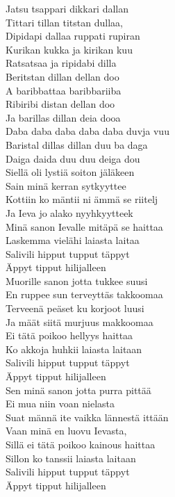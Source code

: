 Jatsu tsappari dikkari dallan\\
Tittari tillan titstan dullaa,\\
Dipidapi dallaa ruppati rupiran\\
Kurikan kukka ja kirikan kuu\\
\hop
Ratsatsaa ja ripidabi dilla\\
Beritstan dillan dellan doo\\
A baribbattaa baribbariiba\\
Ribiribi distan dellan doo\\
Ja barillas dillan deia dooa\\
Daba daba daba daba daba duvja vuu\\
Baristal dillas dillan duu ba daga\\
Daiga daida duu duu deiga dou\\
\hop
Siellä oli lystiä soiton jäläkeen\\
Sain minä kerran sytkyyttee\\
Kottiin ko mäntii ni ämmä se riitelj\\
Ja Ieva jo alako nyyhkyytteek\\
Minä sanon Ievalle mitäpä se haittaa\\
Laskemma vielähi laiasta laitaa\\
Salivili hipput tupput täppyt\\
Äppyt tipput hilijalleen\\
\hop
Muorille sanon jotta tukkee suusi\\
En ruppee sun terveyttäs takkoomaa\\
Terveenä peäset ku korjoot luusi\\
Ja määt siitä murjuus makkoomaa\\
Ei tätä poikoo hellyys haittaa\\
Ko akkoja huhkii laiasta laitaan\\
Salivili hipput tupput täppyt\\
Äppyt tipput hilijalleen\\
\hop
Sen minä sanon jotta purra pittää\\
Ei mua niin voan nielasta\\
Suat männä ite vaikka lännestä ittään\\
Vaan minä en luovu Ievasta,\\
Sillä ei tätä poikoo kainous haittaa\\
Sillon ko tanssii laiasta laitaan\\
Salivili hipput tupput täppyt\\
Äppyt tipput hilijalleen